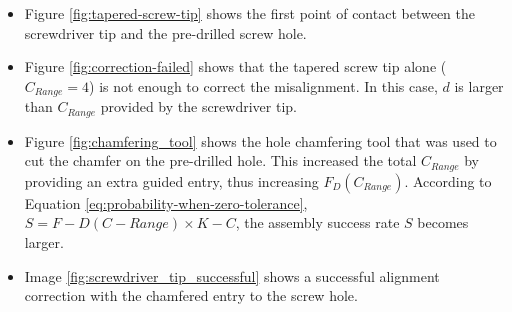\begin{itemize}[nosep]
    \item Figure \ref{fig:tapered-screw-tip} shows the first point of contact between the screwdriver tip and the pre-drilled screw hole.
    \item Figure \ref{fig:correction-failed} shows that the tapered screw tip alone ($C_{Range} = 4$) is not enough to correct the misalignment. In this case, $d$ is larger than $C_{Range}$ provided by the screwdriver tip. 
    \item Figure \ref{fig:chamfering_tool} shows the hole chamfering tool that was used to cut the chamfer on the pre-drilled hole. This increased the total $C_{Range}$ by providing an extra guided entry, thus increasing $F_D(C_{Range})$. According to Equation \ref{eq:probability-when-zero-tolerance}, $S = F-{D}(C-{Range}) \times K-{C}$, the assembly success rate $S$ becomes larger. 
    \item Image \ref{fig:screwdriver_tip_successful} shows a successful alignment correction with the chamfered entry to the screw hole.
\end{itemize}

